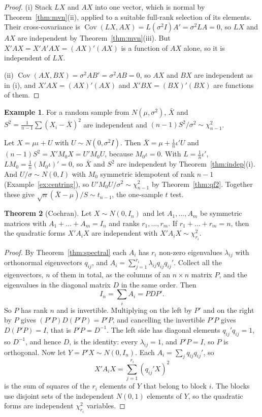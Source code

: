 \documentclass[11pt,a4paper]{article}
\numberwithin{equation}{section}
\DeclareMathOperator{\Cov}{Cov}
\theoremstyle{definition}
\newtheorem{thm}{Theorem}[subsection]
\newtheorem{exa}[thm]{Example}
\begin{document}
\begin{proof}
(i) Stack $LX$ and $AX$ into one vector, which is normal by Theorem~\ref{thm:mvn}(ii), applied to a suitable full-rank selection of its
elements. Their cross-covariance is $\Cov(LX, AX) = L(\sigma^2I)A' = \sigma^2LA = 0$, so $LX$ and $AX$ are independent by Theorem~\ref{thm:mvn}(iii).
But $X'AX = X'A'AX = (AX)'(AX)$ is a function of $AX$ alone, so it is independent of $LX$.

(ii) $\Cov(AX, BX) = \sigma^2AB' = \sigma^2AB = 0$, so $AX$ and $BX$ are independent as in (i), and $X'AX = (AX)'(AX)$ and $X'BX = (BX)'(BX)$ are
functions of them.
\end{proof}

\begin{exa}
\label{ex:xbars2}
For a random sample from $N(\mu, \sigma^2)$, $\bar X$ and $S^2 = \frac{1}{n-1}\sum (X_i - \bar X)^2$ are independent and $(n - 1)S^2/\sigma^2 \sim \chi^2_{n-1}$.

Let $X = \mu\iota + U$ with $U \sim N(0, \sigma^2I)$. Then $\bar X = \mu + \frac1n\iota'U$ and $(n - 1)S^2 = X'M_0X = U'M_0U$, because $M_0\iota = 0$.
With $L = \frac1n\iota'$, $LM_0 = \frac1n(M_0\iota)' = 0$, so $\bar X$ and $S^2$ are independent by Theorem~\ref{thm:indep}(i). And $U/\sigma \sim N(0, I)$
with $M_0$ symmetric idempotent of rank $n - 1$ (Example~\ref{ex:centring}), so $U'M_0U/\sigma^2 \sim \chi^2_{n-1}$ by Theorem~\ref{thm:qf2}. Together these
give $\sqrt n(\bar X - \mu)/S \sim t_{n-1}$, the one-sample $t$ test.
\end{exa}

\begin{thm}[Cochran]
\label{thm:cochran}
Let $X \sim N(0, I_n)$ and let $A_1, \dots, A_m$ be symmetric matrices with $A_1 + \dots + A_m = I_n$ and ranks $r_1, \dots, r_m$. If
$r_1 + \dots + r_m = n$, then the quadratic forms $X'A_iX$ are independent with $X'A_iX \sim \chi^2_{r_i}$.
\end{thm}

\begin{proof}
By Theorem~\ref{thm:spectral} each $A_i$ has $r_i$ non-zero eigenvalues $\lambda_{ij}$ with orthonormal eigenvectors $q_{ij}$, and
$A_i = \sum_{j=1}^{r_i}\lambda_{ij}q_{ij}q_{ij}'$. Collect all the eigenvectors, $n$ of them in total, as the columns of an $n \times n$ matrix $P$, and the
eigenvalues in the diagonal matrix $D$ in the same order. Then
\[
I_n = \sum_iA_i = PDP' .
\]
So $P$ has rank $n$ and is invertible. Multiplying on the left by $P'$ and on the right by $P$ gives $(P'P)D(P'P) = P'P$, and cancelling the invertible
$P'P$ gives $D(P'P) = I$, that is $P'P = D^{-1}$. The left side has diagonal elements $q_{ij}'q_{ij} = 1$, so $D^{-1}$, and hence $D$, is the identity: every
$\lambda_{ij} = 1$, and $P'P = I$, so $P$ is orthogonal. Now let $Y = P'X \sim N(0, I_n)$. Each $A_i = \sum_jq_{ij}q_{ij}'$, so
\[
X'A_iX = \sum_{j=1}^{r_i}(q_{ij}'X)^2
\]
is the sum of squares of the $r_i$ elements of $Y$ that belong to block $i$. The blocks use disjoint sets of the independent $N(0, 1)$ elements of
$Y$, so the quadratic forms are independent $\chi^2_{r_i}$ variables.
\end{proof}
\end{document}
